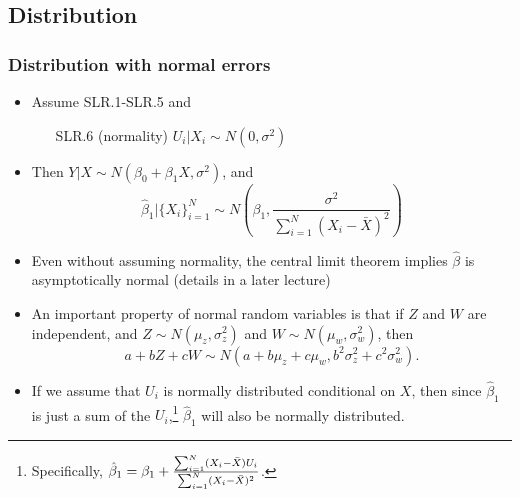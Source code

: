 \subsection{Distribution}
\begin{frame}[allowframebreaks]
  \frametitle{Distribution with normal errors}
  \begin{itemize}
  \item Assume SLR.1-SLR.5 and
    \begin{enumerate}
    \item[SLR.6] (normality) $U_i|X_i \sim N(0,\sigma^2)$
    \end{enumerate}
  \item Then $Y|X \sim N(\beta_0 + \beta_1 X, \sigma^2)$, and
    \[ \hat{\beta}_1|\{X_i\}_{i=1}^N \sim N\left(\beta_1, \frac{\sigma^2}{\sum_{i=1}^N
        (X_i - \bar{X})^2} \right) \]
  \item Even without assuming normality, the central limit theorem
    implies $\hat{\beta}$ is asymptotically normal (details in a later
    lecture)
\framebreak
  \item An important property of normal random variables is that if $Z$ and
$W$ are independent, and $Z \sim N(\mu_z, \sigma_z^2)$ and $W \sim
N(\mu_w, \sigma_w^2)$, then 
\[ a + bZ + cW \sim N(a + b \mu_z + c \mu_w, b^2 \sigma^2_z + c^2
\sigma^2_w). \]
\item  If we assume that $U_i$ is normally distributed
conditional on $X$, then since $\hat{\beta}_1$ is just a sum of the
$U_i$,\footnote{Specifically, $ \hat{\beta}_1 = \beta_1 +
  \frac{{\sum_{i=1}^N} (X_i - \bar{X}) U_i}{{\sum_{i=1}^N} (X_i -
    \bar{X})^2}$.}
$\hat{\beta}_1$ will also be normally distributed. 
 \end{itemize}
\end{frame}

